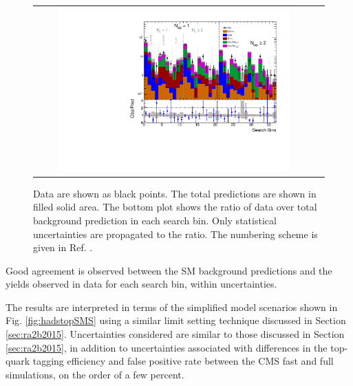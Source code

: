 \begin{figure}[htbp]
  \begin{center}
  \begin{tabular}{cc}
\hspace{-1.5cm}
  \includegraphics[width=0.85\textwidth]{figures/SusySearches/HadStop2015/UnblindPlots.pdf}
  \end{tabular}
  \caption{Data are shown as black points. The total predictions are shown in filled solid area. The bottom plot shows the ratio of data over total background prediction in each search bin. Only statistical uncertainties are propagated to the ratio. The numbering scheme is given in Ref. \cite{CMS:2016nhb}.}
    \label{fig:baseline_SR}
  \end{center}
\end{figure}
Good agreement is observed between the SM background predictions and the yields observed in data for each search bin, within uncertainties.


The results are interpreted in terms of the simplified model scenarios shown in Fig. \ref{fig:hadstopSMS} using a similar limit setting technique discussed in Section \ref{sec:ra2b2015}. Uncertainties considered are similar to those discussed in Section \ref{sec:ra2b2015}, in addition to uncertainties associated with differences in the top-quark tagging efficiency and false positive rate between the CMS fast and full simulations, on the order of a few percent.

